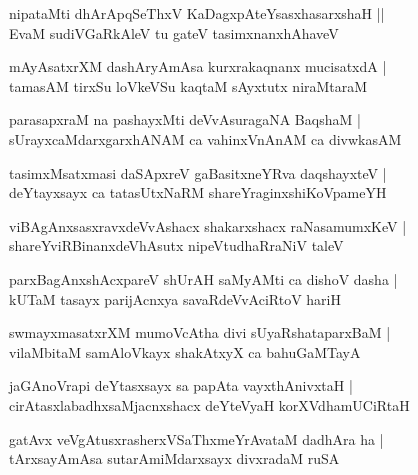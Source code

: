 \documentclass[twoside,12pt,openright]{book}
\newcounter{shloka}[chapter]
\begin{document}
\begin{shloka}%
nipataMti dhArApqSeThxV KaDagxpAteYsasxhasarxshaH ||\\
EvaM sudiVGaRkAleV tu gateV tasimxnanxhAhaveV 
\end{shloka}

\begin{shloka}%
mAyAsatxrXM dashAryAmAsa kurxrakaqnanx mucisatxdA |\\
tamasAM tirxSu loVkeVSu kaqtaM sAyxtutx niraMtaraM 
\end{shloka}

\begin{shloka}%
parasapxraM na pashayxMti deVvAsuragaNA BaqshaM |\\
sUrayxcaMdarxgarxhANAM ca vahinxVnAnAM ca divwkasAM 
\end{shloka}

\begin{shloka}%
tasimxMsatxmasi daSApxreV gaBasitxneYRva daqshayxteV |\\
deYtayxsayx ca tatasUtxNaRM shareYraginxshiKoVpameYH 
\end{shloka}

\begin{shloka}%
viBAgAnxsasxravxdeVvAshacx shakarxshacx raNasamumxKeV |\\
shareYviRBinanxdeVhAsutx nipeVtudhaRraNiV taleV 
\end{shloka}

\begin{shloka}%
parxBagAnxshAcxpareV shUrAH saMyAMti ca dishoV dasha |\\
kUTaM tasayx parijAcnxya savaRdeVvAciRtoV hariH 
\end{shloka}

\begin{shloka}%
swmayxmasatxrXM mumoVcAtha divi sUyaRshataparxBaM |\\
vilaMbitaM samAloVkayx shakAtxyX ca bahuGaMTayA 
\end{shloka}

\begin{shloka}%
jaGAnoVrapi deYtasxsayx sa papAta vayxthAnivxtaH |\\
cirAtasxlabadhxsaMjacnxshacx deYteVyaH korXVdhamUCiRtaH 
\end{shloka}

\begin{shloka}%
gatAvx veVgAtusxrasherxVSaThxmeYrAvataM dadhAra ha |\\
tArxsayAmAsa sutarAmiMdarxsayx divxradaM ruSA 
\end{shloka}
\end{document}
